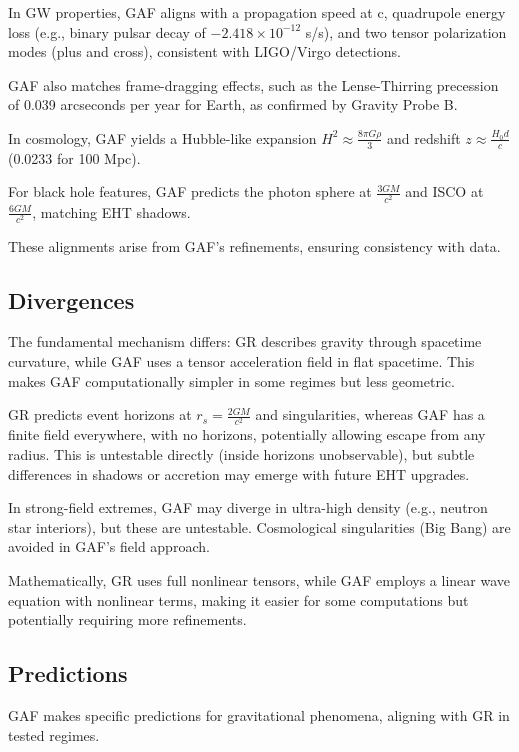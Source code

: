 \documentclass{article}
\begin{document}
In GW properties, GAF aligns with a propagation speed at c, quadrupole energy loss (e.g., binary pulsar decay of \( -2.418 \times 10^{-12} \) s/s), and two tensor polarization modes (plus and cross), consistent with LIGO/Virgo detections.

GAF also matches frame-dragging effects, such as the Lense-Thirring precession of 0.039 arcseconds per year for Earth, as confirmed by Gravity Probe B.

In cosmology, GAF yields a Hubble-like expansion \( H^2 \approx \frac{8 \pi G \rho}{3} \) and redshift \( z \approx \frac{H_0 d}{c} \) (0.0233 for 100 Mpc).

For black hole features, GAF predicts the photon sphere at \( \frac{3 G M}{c^2} \) and ISCO at ~ \( \frac{6 G M}{c^2} \), matching EHT shadows.

These alignments arise from GAF's refinements, ensuring consistency with data.

\subsection{Divergences}

The fundamental mechanism differs: GR describes gravity through spacetime curvature, while GAF uses a tensor acceleration field in flat spacetime. This makes GAF computationally simpler in some regimes but less geometric.

GR predicts event horizons at \( r_s = \frac{2 G M}{c^2} \) and singularities, whereas GAF has a finite field everywhere, with no horizons, potentially allowing escape from any radius. This is untestable directly (inside horizons unobservable), but subtle differences in shadows or accretion may emerge with future EHT upgrades.

In strong-field extremes, GAF may diverge in ultra-high density (e.g., neutron star interiors), but these are untestable. Cosmological singularities (Big Bang) are avoided in GAF's field approach.

Mathematically, GR uses full nonlinear tensors, while GAF employs a linear wave equation with nonlinear terms, making it easier for some computations but potentially requiring more refinements.

\subsection{Predictions}

GAF makes specific predictions for gravitational phenomena, aligning with GR in tested regimes.
\end{document}
